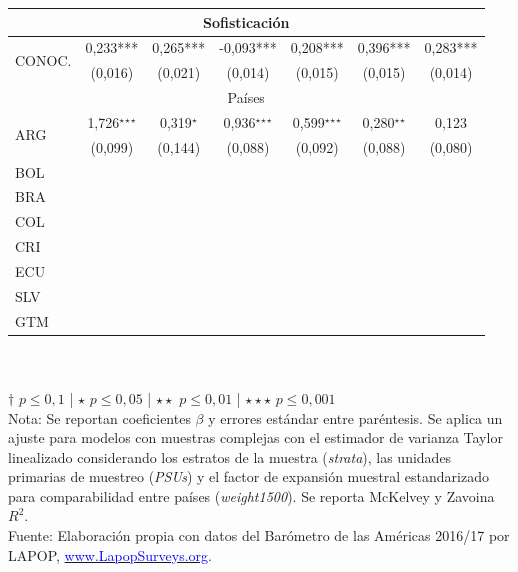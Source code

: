 \documentclass[a4paper]{tufte-handout}
\begin{document}
\begin{table}[h]
\begin{tabular}{l c c c c c c}
    \multicolumn{7}{c}{Sofisticación} \\ \midrule
    \multirow{2}{*}{CONOC.} & 0,233*** & 0,265*** & -0,093*** & 0,208*** & 0,396*** & 0,283*** \\
    & {\scriptsize (0,016)} & {\scriptsize (0,021)} & {\scriptsize (0,014)} & {\scriptsize (0,015)} & {\scriptsize (0,015)} & {\scriptsize (0,014)} \\ \midrule
    \multicolumn{7}{c}{Países} \\ \midrule
    \multirow{2}{*}{ARG} & 1,726$^\star$$^\star$$^\star$ & 0,319$^\star$ & 0,936$^\star$$^\star$$^\star$ & 0,599$^\star$$^\star$$^\star$ & 0,280$^\star$$^\star$ & 0,123 \\
    & {\scriptsize (0,099)} & {\scriptsize (0,144)} & {\scriptsize (0,088)} & {\scriptsize (0,092)} & {\scriptsize (0,088)} & {\scriptsize (0,080)} \\
    \multirow{2}{*}{BOL} & & & & & & \\
    & & & & & & \\
    \multirow{2}{*}{BRA} & & & & & & \\
    & & & & & & \\
    \multirow{2}{*}{COL} & & & & & & \\
    & & & & & & \\
    \multirow{2}{*}{CRI} & & & & & & \\
    & & & & & & \\
    \multirow{2}{*}{ECU} & & & & & & \\
    & & & & & & \\
    \multirow{2}{*}{SLV} & & & & & & \\
    & & & & & & \\
    \multirow{2}{*}{GTM} & & & & & & \\
    & & & & & & \\ \bottomrule
  \end{tabular}
  \\~\\ \smallskip\noindent\scriptsize $\dagger$ $p \leq 0,1$ | $\star$ $p \leq 0,05$ | $\star\star$ $p \leq 0,01$ | $\star\star\star$ $p \leq 0,001$  \\ Nota: Se reportan coeficientes $\beta$ y errores estándar entre paréntesis. Se aplica un ajuste para modelos con muestras complejas con el estimador de varianza Taylor linealizado considerando los estratos de la muestra ({\itshape strata}), las unidades primarias de muestreo ({\itshape PSUs}) y el factor de expansión muestral estandarizado para comparabilidad entre países ({\itshape weight1500}). Se reporta McKelvey y Zavoina $R^2$. \\ Fuente: Elaboración propia con datos del Barómetro de las Américas 2016/17 por LAPOP, \href{https://www.vanderbilt.edu/lapop/}{\textcolor{blue}{www.LapopSurveys.org}}.
\end{table}
\end{document}
